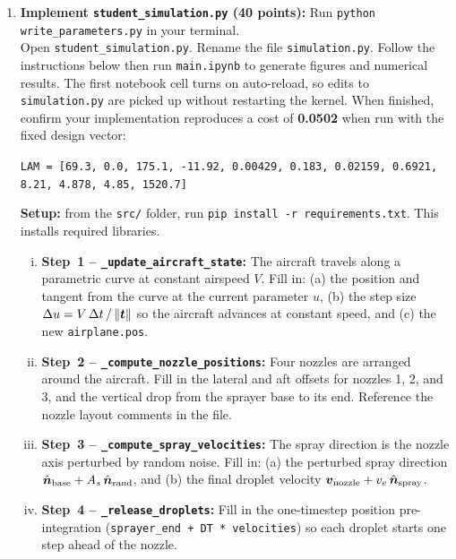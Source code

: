 \documentclass{article}
\begin{document}
\begin{enumerate}
\item[2. (b)] \textbf{Implement \texttt{student\_simulation.py} (40 points):}
Run \texttt{python write\_parameters.py} in your terminal. \\ Open \texttt{student\_simulation.py}. Rename the file \texttt{simulation.py}. Follow the instructions below then run \texttt{main.ipynb} to generate figures and numerical results. The first notebook cell turns on auto-reload, so edits to \texttt{simulation.py} are picked up without restarting the kernel.
When finished, confirm your implementation reproduces a cost of \textbf{0.0502} when run with the fixed design vector:
\begin{center}
\texttt{LAM = [69.3, 0.0, 175.1, -11.92, 0.00429, 0.183, 0.02159, 0.6921, 8.21, 4.878, 4.85, 1520.7]}
\end{center}

\medskip
\noindent\textbf{Setup:} from the \texttt{src/} folder, run \texttt{pip install -r requirements.txt}. This installs required libraries.

\begin{enumerate}[(i)]
    \item \textbf{Step~1 -- \texttt{\_update\_aircraft\_state}:}
          The aircraft travels along a parametric curve at constant airspeed $V$.
          Fill in: (a) the position and tangent from the curve at the current parameter $u$,
          (b) the step size $\Delta u = V\,\Delta t\,/\,\|\mbox{\boldmath $t$}\|$ so the aircraft advances at constant speed, and
          (c) the new \texttt{airplane.pos}.

    \item \textbf{Step~2 -- \texttt{\_compute\_nozzle\_positions}:}
          Four nozzles are arranged around the aircraft.
          Fill in the lateral and aft offsets for nozzles 1, 2, and 3, and the
          vertical drop from the sprayer base to its end.
          Reference the nozzle layout comments in the file.

    \item \textbf{Step~3 -- \texttt{\_compute\_spray\_velocities}:}
          The spray direction is the nozzle axis perturbed by random noise.
          Fill in: (a) the perturbed spray direction
          $\hat{\mbox{\boldmath $n$}}_\text{base} + A_s\,\hat{\mbox{\boldmath $n$}}_\text{rand}$, and
          (b) the final droplet velocity $\mbox{\boldmath $v$}_\text{nozzle} + v_e\,\hat{\mbox{\boldmath $n$}}_\text{spray}$.

    \item \textbf{Step~4 -- \texttt{\_release\_droplets}:}
          Fill in the one-timestep position pre-integration
          (\texttt{sprayer\_end + DT * velocities}) so each droplet starts
          one step ahead of the nozzle.


\end{enumerate}
\end{enumerate}
\end{document}
